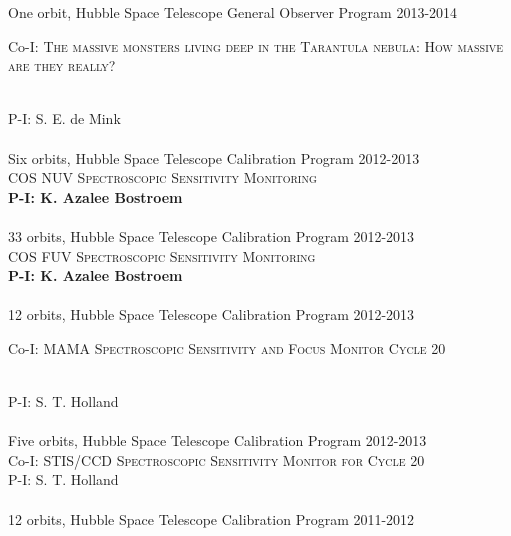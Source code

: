 \documentclass[10pt]{cv}
\begin{document}
\begin{llist}
One orbit, Hubble Space Telescope General Observer Program \hfill  2013-2014\\ %
\begin{minipage}[l]{0.7\textwidth}\vspace{0.15cm}
Co-I: \textsc{The massive monsters living deep in the Tarantula nebula: How massive are they really?} 
\end{minipage}\vspace{0.15cm}\\
P-I: S. E. de Mink\\ %
\\
Six orbits, Hubble Space Telescope Calibration Program \hfill 2012-2013\\ %
\textsc{COS NUV Spectroscopic Sensitivity Monitoring}\\
{\bf P-I: K. Azalee Bostroem} \\ %
\\
33 orbits, Hubble Space Telescope Calibration Program \hfill 2012-2013\\ %
\textsc{COS FUV Spectroscopic Sensitivity Monitoring}\\
{\bf P-I: K. Azalee Bostroem} \\ %
\\
12 orbits, Hubble Space Telescope Calibration Program \hfill  2012-2013\\ %
\begin{minipage}[l]{0.7\textwidth}\vspace{0.15cm}
Co-I: \textsc{MAMA Spectroscopic Sensitivity and Focus Monitor Cycle 20}
\end{minipage}\vspace{0.15cm}\\
P-I: S. T. Holland\\ %
\\
Five orbits, Hubble Space Telescope Calibration Program \hfill  2012-2013\\ %
Co-I: \textsc{STIS/CCD Spectroscopic Sensitivity Monitor for Cycle 20} \\
P-I: S. T. Holland\\ %
\\
12 orbits, Hubble Space Telescope Calibration Program \hfill 2011-2012\\ %

\end{llist}
\end{document}
